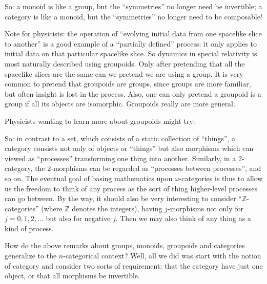 \documentclass{article}
\def\tightlist{}
\renewcommand{\texttt}[1]{%
  \begingroup
  \ttfamily
  \begingroup\lccode`~=`/\lowercase{\endgroup\def~}{/\discretionary{}{}{}}%
  \begingroup\lccode`~=`[\lowercase{\endgroup\def~}{[\discretionary{}{}{}}%
  \begingroup\lccode`~=`.\lowercase{\endgroup\def~}{.\discretionary{}{}{}}%
  \catcode`/=\active\catcode`[=\active\catcode`.=\active
  \scantokens{#1\noexpand}%
  \endgroup
}
\begin{document}
So: a monoid is like a group, but the ``symmetries'' no longer need be
invertible; a category is like a monoid, but the ``symmetries'' no
longer need to be composable!

Note for physicists: the operation of ``evolving initial data from one
spacelike slice to another'' is a good example of a ``partially
defined'' process: it only applies to initial data on that particular
spacelike slice. So dynamics in special relativity is most naturally
described using groupoids. Only after pretending that all the spacelike
slices are the same can we pretend we are using a group. It is very
common to pretend that groupoids are groups, since groups are more
familiar, but often insight is lost in the process. Also, one can only
pretend a groupoid is a group if all its objects are isomorphic.
Groupoids really are more general.

Physicists wanting to learn more about groupoids might try:


So: in contrast to a set, which consists of a static collection of
``things'', a category consists not only of objects or ``things'' but
also morphisms which can viewed as ``processes'' transforming one thing
into another. Similarly, in a 2-category, the 2-morphisms can be
regarded as ``processes between processes'', and so on. The eventual
goal of basing mathematics upon \(\omega\)-categories is thus to allow
us the freedom to think of any process as the sort of thing higher-level
processes can go between. By the way, it should also be very interesting
to consider ``\(\mathbb{Z}\)-categories'' (where \(\mathbb{Z}\) denotes
the integers), having \(j\)-morphisms not only for \(j = 0,1,2,\ldots\)
but also for negative \(j\). Then we may also think of any thing as a
kind of process.

How do the above remarks about groups, monoids, groupoids and categories
generalize to the \(n\)-categorical context? Well, all we did was start
with the notion of category and consider two sorts of requirement: that
the category have just one object, or that all morphisms be invertible.
\end{document}
